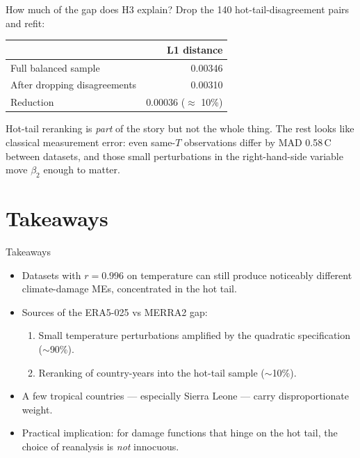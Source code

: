 \documentclass[10pt,aspectratio=169]{beamer}
\begin{document}
\begin{frame}{How much of the gap does H3 explain?}
  Drop the 140 hot-tail-disagreement pairs and refit:

  \vspace{0.5em}
  \centering
  \begin{tabular}{l r}
    \toprule
    & L1 distance \\
    \midrule
    Full balanced sample         & 0.00346 \\
    After dropping disagreements & 0.00310 \\
    \midrule
    Reduction                    & 0.00036 ($\approx$ 10\%) \\
    \bottomrule
  \end{tabular}

  \vspace{0.8em}
  \footnotesize
  Hot-tail reranking is \emph{part} of the story but not the whole thing. The
  rest looks like classical measurement error: even same-$T$ observations
  differ by MAD 0.58\,\textdegree C between datasets, and those small
  perturbations in the right-hand-side variable move $\beta_2$ enough to
  matter.
\end{frame}

\section{Takeaways}

\begin{frame}{Takeaways}
  \begin{itemize}
    \item Datasets with $r=0.996$ on temperature can still produce noticeably
          different climate-damage MEs, concentrated in the hot tail.
    \item Sources of the ERA5-025 vs MERRA2 gap:
      \begin{enumerate}
        \item Small temperature perturbations amplified by the quadratic
              specification ($\sim$90\%).
        \item Reranking of country-years into the hot-tail sample ($\sim$10\%).
      \end{enumerate}
    \item A few tropical countries --- especially Sierra Leone --- carry
          disproportionate weight.
    \item Practical implication: for damage functions that hinge on the hot
          tail, the choice of reanalysis is \emph{not} innocuous.
  \end{itemize}
\end{frame}
\end{document}
